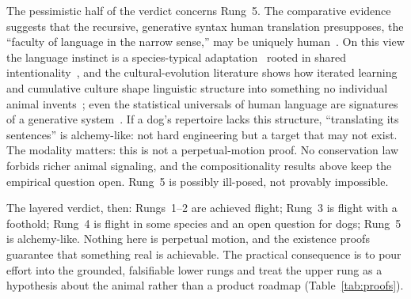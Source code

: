The pessimistic half of the verdict concerns Rung~5. The comparative
evidence suggests that the recursive, generative syntax human translation
presupposes, the ``faculty of language in the narrow sense,'' may be
uniquely human~\cite{hauser2002faculty,chomsky1957syntactic,hauser1996evolution}.
On this view the language instinct is a species-typical
adaptation~\cite{pinker1994instinct} rooted in shared
intentionality~\cite{tomasello2008origins}, and the cultural-evolution
literature shows how iterated learning and cumulative culture shape
linguistic structure into something no individual animal
invents~\cite{kirby2008cumulative,smith2003iterated}; even the statistical
universals of human language are signatures of a generative
system~\cite{zipf1949human}. If a dog's repertoire lacks this structure,
``translating its sentences'' is alchemy-like: not hard engineering but a
target that may not exist. The modality matters: this is not a
perpetual-motion proof. No conservation law forbids richer animal
signaling, and the compositionality results above keep the empirical
question open. Rung~5 is possibly ill-posed, not provably impossible.

The layered verdict, then: Rungs~1--2 are achieved flight; Rung~3 is flight
with a foothold; Rung~4 is flight in some species and an open question for
dogs; Rung~5 is alchemy-like. Nothing here is perpetual motion, and the
existence proofs guarantee that something real is achievable. The practical
consequence is to pour effort into the grounded, falsifiable lower rungs and
treat the upper rung as a hypothesis about the animal rather than a product
roadmap (Table~\ref{tab:proofs}).

